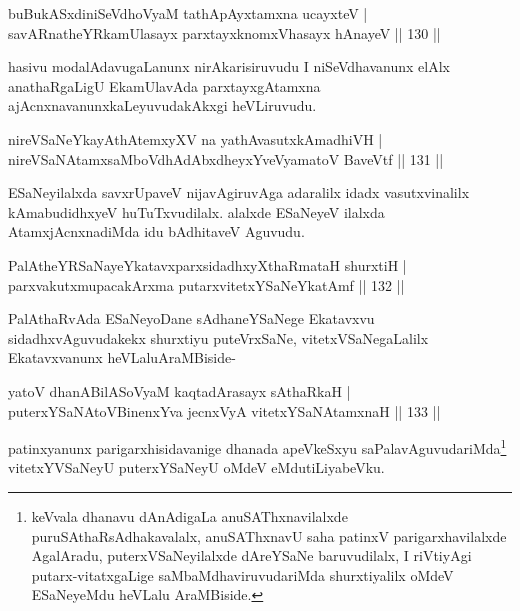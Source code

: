 \begin{shl}
buBukASxdiniSeVdhoV\s yaM tathA\s pAyxtamxna ucayxteV |\\
savARnatheYRkamUlasayx parxtayxknomxVhasayx hAnayeV \hfill || 130 ||
\end{shl}

\begin{artha}
hasivu modalAdavugaLanunx nirAkarisiruvudu I niSeVdhavanunx elAlx anathaRgaLigU EkamUlavAda parxtayxgAtamxna ajAcnxnavanunx\break kaLeyuvudakAkxgi heVLiruvudu.
\end{artha}

\begin{shl}
nireVSaNeYkayAthAtemxyXV na yathAvasutxkAmadhiVH |\\
nireVSaNAtamxsaMboVdhAdAbxdheyxYveVyamatoV BaveVtf \hfill || 131 ||
\end{shl}

\begin{artha}
ESaNeyilalxda savxrUpaveV nijavAgiruvAga adaralilx idadx vasutxvinalilx kAmabudidhxyeV huTuTxvudilalx. alalxde ESaNeyeV ilalxda AtamxjAcnxnadiMda idu bAdhitaveV Aguvudu.
\end{artha}

\begin{shl}
PalAtheYRSaNayeYkatavxparxsidadhxyXthaRmataH shurxtiH |\\
parxvakutxmupacakArxma putarxvitetxYSaNeYkatAmf \hfill || 132 ||
\end{shl}

\begin{artha}
PalAthaRvAda ESaNeyoDane sAdhaneYSaNege Ekatavxvu sidadhxvAguvudakekx shurxtiyu puteVrxSaNe, vitetxVSaNegaLalilx Ekatavxvanunx heVLalu\break AraMBiside-
\end{artha}


\begin{shl}
yatoV dhanABilASoV\s yaM kaqtadArasayx sAthaRkaH |\\
puterxYSaNA\s toV\s BinenxYva jecnxVyA vitetxYSaNAtamxnaH \hfill || 133 ||
\end{shl}

\begin{artha}
patinxyanunx parigarxhisidavanige dhanada apeVkeSxyu saPalavAguvudariMda\footnote{keVvala dhanavu dAnAdigaLa anuSAThxnavilalxde puruSAthaRsAdhakavalalx, anuSAThxnavU saha patinxV parigarxhavilalxde AgalAradu, puterxVSaNeyilalxde dAreYSaNe baruvudilalx, I riVtiyAgi putarx-vitatxgaLige saMbaMdhaviruvudariMda shurxtiyalilx oMdeV ESaNeyeMdu heVLalu AraMBiside.} vitetxYVSaNeyU puterxYSaNeyU oMdeV eMdu\break tiLiyabeVku.
\end{artha}

